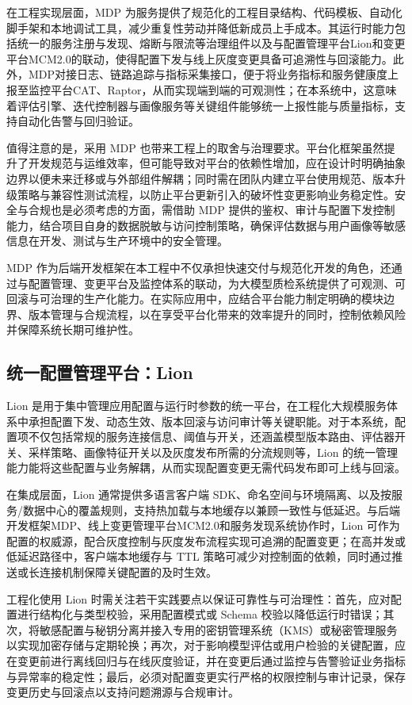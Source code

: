 在工程实现层面，MDP 为服务提供了规范化的工程目录结构、代码模板、自动化脚手架和本地调试工具，减少重复性劳动并降低新成员上手成本。其运行时能力包括统一的服务注册与发现、熔断与限流等治理组件以及与配置管理平台Lion和变更平台MCM2.0的联动\cite{10975819,Mohammad_2025}，使得配置下发与线上灰度变更具备可追溯性与回滚能力。此外，MDP对接日志、链路追踪与指标采集接口，便于将业务指标和服务健康度上报至监控平台CAT、Raptor，从而实现端到端的可观测性；在本系统中，这意味着评估引擎、迭代控制器与画像服务等关键组件能够统一上报性能与质量指标，支持自动化告警与回归验证。

值得注意的是，采用 MDP 也带来工程上的取舍与治理要求。平台化框架虽然提升了开发规范与运维效率，但可能导致对平台的依赖性增加，应在设计时明确抽象边界以便未来迁移或与外部组件解耦；同时需在团队内建立平台使用规范、版本升级策略与兼容性测试流程，以防止平台更新引入的破坏性变更影响业务稳定性。安全与合规也是必须考虑的方面，需借助 MDP 提供的鉴权、审计与配置下发控制能力，结合项目自身的数据脱敏与访问控制策略，确保评估数据与用户画像等敏感信息在开发、测试与生产环境中的安全管理。

MDP 作为后端开发框架在本工程中不仅承担快速交付与规范化开发的角色，还通过与配置管理、变更平台及监控体系的联动，为大模型质检系统提供了可观测、可回滚与可治理的生产化能力。在实际应用中，应结合平台能力制定明确的模块边界、版本管理与合规流程，以在享受平台化带来的效率提升的同时，控制依赖风险并保障系统长期可维护性\cite{Thalary_Katipelly_2025}。
\subsection{统一配置管理平台：Lion}
Lion 是用于集中管理应用配置与运行时参数的统一平台，在工程化大规模服务体系中承担配置下发、动态生效、版本回滚与访问审计等关键职能\cite{https://doi.org/10.1002/smr.2496}。对于本系统，配置项不仅包括常规的服务连接信息、阈值与开关，还涵盖模型版本路由、评估器开关、采样策略、画像特征开关以及灰度发布所需的分流规则等，Lion 的统一管理能力能将这些配置与业务解耦，从而实现配置变更无需代码发布即可上线与回滚。

在集成层面，Lion 通常提供多语言客户端 SDK、命名空间与环境隔离、以及按服务/数据中心的覆盖规则，支持热加载与本地缓存以兼顾一致性与低延迟。与后端开发框架MDP、线上变更管理平台MCM2.0和服务发现系统协作时，Lion 可作为配置的权威源，配合灰度控制与灰度发布流程实现可追溯的配置变更；在高并发或低延迟路径中，客户端本地缓存与 TTL 策略可减少对控制面的依赖，同时通过推送或长连接机制保障关键配置的及时生效。

工程化使用 Lion 时需关注若干实践要点以保证可靠性与可治理性：首先，应对配置进行结构化与类型校验，采用配置模式或 Schema 校验以降低运行时错误；其次，将敏感配置与秘钥分离并接入专用的密钥管理系统（KMS）或秘密管理服务以实现加密存储与定期轮换；再次，对于影响模型评估或用户检验的关键配置，应在变更前进行离线回归与在线灰度验证，并在变更后通过监控与告警验证业务指标与异常率的稳定性；最后，必须对配置变更实行严格的权限控制与审计记录，保存变更历史与回滚点以支持问题溯源与合规审计。
